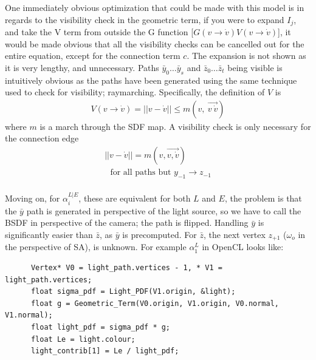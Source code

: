 \documentclass{article}
\begin{document}
    One immediately obvious optimization that could be made with this model is
    in regards to the visibility check in the geometric term, if you were to
    expand $I_j$, and take the V term from outside the G function
    [$G(v \rightarrow
    \dot{v}) V(v \rightarrow \dot{v})$],
    it would be made obvious that all the visibility checks can be
    cancelled out for the entire equation, except for the connection term $c$.
    The expansion is not shown as it is very lengthy, and unnecessary. Paths
    $\bar{y}_{0} \ldots \bar{y}_s$ and $\bar{z}_0 \ldots \bar{z}_t$ being
    visible is intuitively obvious as the paths have been generated using the
    same technique used to check for visibility; raymarching. Specifically, the
    definition of $V$ is
  \begin{align}
    V(v \rightarrow \dot{v}) = ||v - \dot{v}|| \leq
    m(v,\:\overrightarrow{v\:\dot{v}})
  \end{align}
    where $m$ is a march through the SDF map. A visibility check is only
    necessary for the connection edge
    \begin{align*}
      ||v - \dot{v}|| = m(v, \overrightarrow{v, \dot{v}})\\
      \:\:\:\text{for all paths but } y_{-1} \rightarrow z_{-1} 
    \end{align*}
\\
    Moving on, for $\alpha^{L|E}_i$, these are equivalent for both $L$ and $E$,
    the problem is that the $\bar{y}$ path is generated in perspective of the
    light source, so we have to call the BSDF in perspective of the camera; the
    path is flipped. Handling $\bar{y}$ is significantly easier than $\bar{z}$,
    as $\bar{y}$ is precomputed. For $\bar{z}$, the next vertex $z_{+1}$
    ($\omega_o$ in the perspective of SA), is unknown. For example $\alpha^L_1$
    in OpenCL looks like:

    \begin{lstlisting}
      Vertex* V0 = light_path.vertices - 1, * V1 = light_path.vertices;
      float sigma_pdf = Light_PDF(V1.origin, &light);
      float g = Geometric_Term(V0.origin, V1.origin, V0.normal, V1.normal);
      float light_pdf = sigma_pdf * g;
      float Le = light.colour;
      light_contrib[1] = Le / light_pdf;
    \end{lstlisting}
\end{document}
